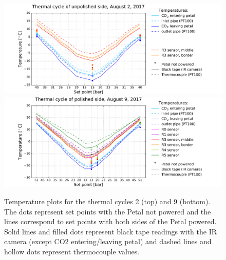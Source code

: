 		\begin{figure}[ht!]
			\centering
			\captionsetup{justification=centering,margin=0cm}
			\includegraphics[scale=0.45]{Figures/Chapter04/unwrapped_cycle_2_201711121522.pdf}
			\includegraphics[scale=0.45]{Figures/Chapter04/unwrapped_cycle_9_201711121522.pdf}
			\caption{Temperature plots for the thermal cycles 2 (top) and 9 (bottom). The dots represent set points with the Petal not powered and the lines correspond to set points with both sides of the Petal powered. Solid lines and filled dots represent black tape readings with the IR camera (except CO2 entering/leaving petal) and dashed lines and hollow dots represent thermocouple values.}\label{fig4.1}
		\end{figure}	
		
